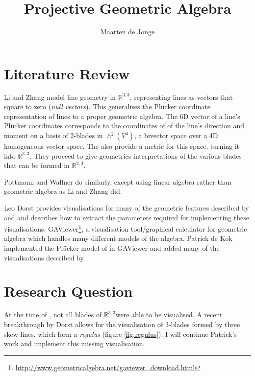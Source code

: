 \documentclass[a4paper, 10pt]{article}
\author{Maarten de Jonge}
\title{Projective Geometric Algebra}
\begin{document}
\newcommand{\rp}{$\mathbb{R}^{3,3}$}

\maketitle

\section*{Literature Review}
Li and Zhang\cite{hangbo2011} model line geometry in $\mathbb{R}^{3,3}$,
representing lines as vectors that square to zero (\emph{null vectors}). This
generalises the Pl\"{u}cker coordinate representation of lines to a proper
geometric algebra. The 6D vector of a line's Pl\"{u}cker coordinates corresponds
to the coordinates of of the line's direction and moment on a basis of 2-blades
in $\wedge^2(V^4)$, a bivector space over a 4D homogeneous vector space. The
also provide a metric for this space, turning it into $\mathbb{R}^{3, 3}$.
They proceed to give geometrics interpretations of the various blades that can
be formed in $\mathbb{R}^{3, 3}$.

Pottmann and Wallner\cite{pottmann2001computational} do similarly, except using
linear algebra rather than geometric algebra as Li and Zhang did.

Leo Dorst\cite{dorst2013versors} provides visualisations for many of the
geometric features described by \cite{hangbo2011} and
\cite{pottmann2001computational} and describes how to extract the parameters
required for implementing these visualisations.
GAViewer\footnote{\url{http://www.geometricalgebra.net/gaviewer\_download.html}},
a visualisation tool/graphical calculator for geometric algebra which handles
many different models of the algebra. Patrick de Kok\cite{dekok2012} implemented
the Pl\"{u}cker model of \cite{hangbo2011} in GAViewer and added many of the
visualisations described by \cite{dorst2013versors}.

\section*{Research Question}
At the time of \cite{dekok2012}, not all blades of \rp were able to be
visualised. A recent breakthrough by Dorst allows for the visualisation of
3-blades formed by three skew lines, which form a \emph{regulus} (figure
\ref{fig:regulus}). I will continue Patrick's work and implement this missing
visualisation.
\end{document}
